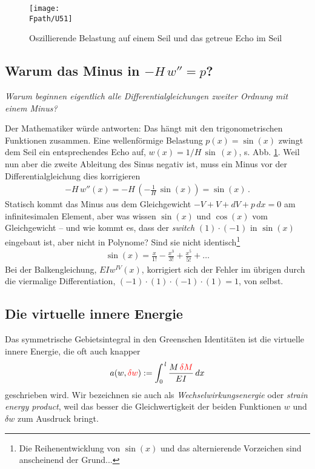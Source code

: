 {{{{{%
\begin{figure}[tbp]
\centering
\if {} \sidecaption \fi
\texttt{[image: \\Fpath/U51]}
\caption{Oszillierende Belastung auf einem Seil und das getreue Echo im Seil} \label{U51}
\end{figure}%

{\textcolor{sectionTitleBlue}{\section{Warum das Minus in $-H\,w'' = p$?}}}
{\em Warum beginnen eigentlich alle Differentialgleichungen zweiter Ordnung mit einem Minus?\/}

Der Mathematiker w\"{u}rde antworten: Das h\"{a}ngt mit den trigonometrischen Funktionen zusammen. Eine wellenf\"{o}rmige Belastung $ p(x) = \sin (x)$ zwingt dem Seil ein entsprechendes Echo auf, $w(x) = 1/H \,\sin \,(x)$, s. Abb. \ref{U51}. Weil nun aber die zweite Ableitung des Sinus negativ ist, muss ein Minus vor der Differentialgleichung dies korrigieren
\begin{align}
- H\,w''(x) = - H\,(- \frac{1}{H}\,\sin(x)) = \sin(x)\,.
\end{align}
Statisch kommt das Minus aus dem Gleichgewicht $- V + V + dV + p\,dx = 0$ am infinitesimalen Element, aber was wissen $\sin (x)$ und $\cos(x)$ vom Gleichgewicht -- und wie kommt es, dass der {\em switch\/} $(1) \cdot (-1)$ in  $\sin(x)$ eingebaut ist, aber nicht in Polynome? Sind sie nicht identisch\footnote{Die Reihenentwicklung von $\sin(x)$ und das alternierende Vorzeichen sind anscheinend der Grund...}
\begin{align}
\sin(x) = \frac{x}{1!} - \frac{x^3}{3!} + \frac{x^5}{5!} + \ldots
\end{align}
Bei der Balkengleichung, $ EI w^{IV}(x)$, korrigiert sich der \glq Fehler\grq{} im \"{u}brigen durch die  viermalige Differentiation, $(-1) \cdot (1) \cdot (-1) \cdot (1) = 1$, von selbst.


{\textcolor{sectionTitleBlue}{\section{Die virtuelle innere Energie}}}
Das symmetrische Gebietsintegral in den  Greenschen Identit\"{a}ten ist die virtuelle innere Energie, die oft auch knapper
\begin{align}
a(w,\textcolor{red}{\delta w}) := \int_0^{\,l} \frac{M\,\textcolor{red}{\delta M}} {EI}\,dx
\end{align}
geschrieben wird. Wir bezeichnen sie auch als {\em Wechselwirkungsenergie\/} oder {\em strain energy product\/}, weil das besser die Gleichwertigkeit der beiden Funktionen  $w$ und $\delta w$ zum Ausdruck bringt.

}}}}}
